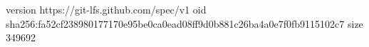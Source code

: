 version https://git-lfs.github.com/spec/v1
oid sha256:fa52cf238980177170e95be0ca0ead08ff9d0b881c26ba4a0e7f0fb9115102c7
size 349692
